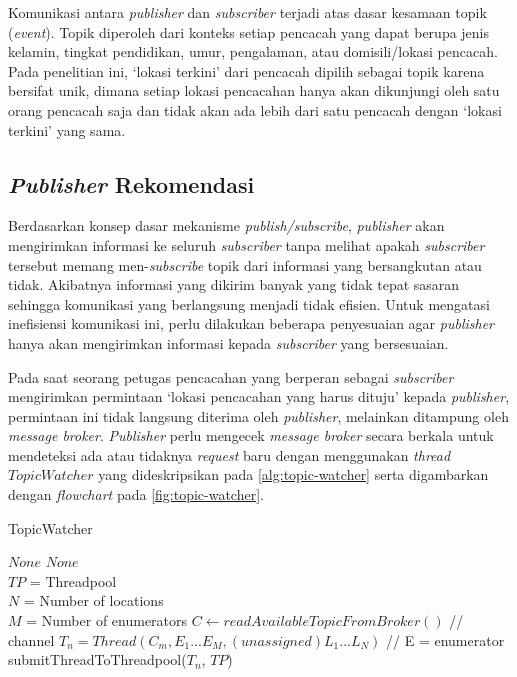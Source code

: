 Komunikasi antara \textit{publisher} dan \textit{subscriber} terjadi atas dasar kesamaan topik (\textit{event}). Topik diperoleh dari konteks setiap pencacah yang dapat berupa jenis kelamin, tingkat pendidikan, umur, pengalaman, atau domisili/lokasi pencacah. Pada penelitian ini, `lokasi terkini' dari pencacah dipilih sebagai topik karena bersifat unik, dimana setiap lokasi pencacahan hanya akan dikunjungi oleh satu orang pencacah saja dan tidak akan ada lebih dari satu pencacah dengan `lokasi terkini' yang sama.


\subsection{\textit{Publisher} Rekomendasi}
\label{ssec:publisher}
Berdasarkan konsep dasar mekanisme \textit{publish/subscribe}, \textit{publisher} akan mengirimkan informasi ke seluruh \textit{subscriber} tanpa melihat apakah \textit{subscriber} tersebut memang men-\textit{subscribe} topik dari informasi yang bersangkutan atau tidak. Akibatnya informasi yang dikirim banyak yang tidak tepat sasaran sehingga komunikasi yang berlangsung menjadi tidak efisien. Untuk mengatasi inefisiensi komunikasi ini, perlu dilakukan beberapa penyesuaian agar \textit{publisher} hanya akan mengirimkan informasi kepada \textit{subscriber} yang bersesuaian. 

Pada saat seorang petugas pencacahan yang berperan sebagai \textit{subscriber} mengirimkan permintaan `lokasi pencacahan yang harus dituju' kepada \textit{publisher}, permintaan ini tidak langsung diterima oleh \textit{publisher}, melainkan ditampung oleh \textit{message broker}. \textit{Publisher} perlu mengecek \textit{message broker} secara berkala untuk mendeteksi ada atau tidaknya \textit{request} baru dengan menggunakan \textit{thread} $TopicWatcher$ yang dideskripsikan pada \autoref{alg:topic-watcher} serta digambarkan dengan \textit{flowchart} pada \autoref{fig:topic-watcher}. 


\begin{algorithm}[!]
	\caption{TopicWatcher}
	\label{alg:topic-watcher}
	\begin{algorithmic}[1]
		\renewcommand{\algorithmicrequire}{\textbf{Input:}}
		\renewcommand{\algorithmicensure}{\textbf{Output:}}
		\REQUIRE $None$
		\ENSURE  $None$
		\\ $TP$ = Threadpool
		\\ $N$ = Number of locations
		\\ $M$ = Number of enumerators
		\STATE $C \leftarrow readAvailableTopicFromBroker()$	// channel
		\STATE $T_n = Thread(C_m, E_1...E_M, (unassigned) L_1...L_N)$		// E = enumerator
		\STATE submitThreadToThreadpool($T_n$, $TP$)
		\ENDIF
		\ENDFOR
		\ENDFOR
		\ENDWHILE
	\end{algorithmic}
\end{algorithm}


